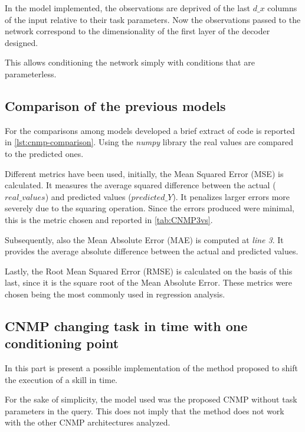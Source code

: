 In the model implemented, the observations are deprived of the last $d\_x$ columns of the input relative to their task parameters. Now the observations passed to the network correspond to the dimensionality of the first layer of the decoder designed.

This allows conditioning the network simply with conditions that are parameterless. 


\subsection{Comparison of the previous models}

For the comparisons among models developed a brief extract of code is reported in \cref{lst:cnmp-comparison}. Using the \emph{numpy} library the real values are compared to the predicted ones. 

Different metrics have been used, initially, the Mean Squared Error (MSE) is calculated. It measures the average squared difference between the actual ($real\_values$) and predicted values ($predicted\_Y$). It penalizes larger errors more severely due to the squaring operation. Since the errors produced were minimal, this is the metric chosen and reported in \cref{tab:CNMP3vs}.

Subsequently, also the Mean Absolute Error (MAE) is computed at \emph{line 3}. It provides the average absolute difference between the actual and predicted values.

Lastly, the Root Mean Squared Error (RMSE) is calculated on the basis of this last, since it is the square root of the Mean Absolute Error. These metrics were chosen being the most commonly used in regression analysis.




\subsection{CNMP changing task in time with one conditioning point}
In this part is present a possible implementation of the method proposed to shift the execution of a skill in time.

For the sake of simplicity, the model used was the proposed CNMP without task parameters in the query. This does not imply that the method does not work with the other CNMP architectures analyzed. 

